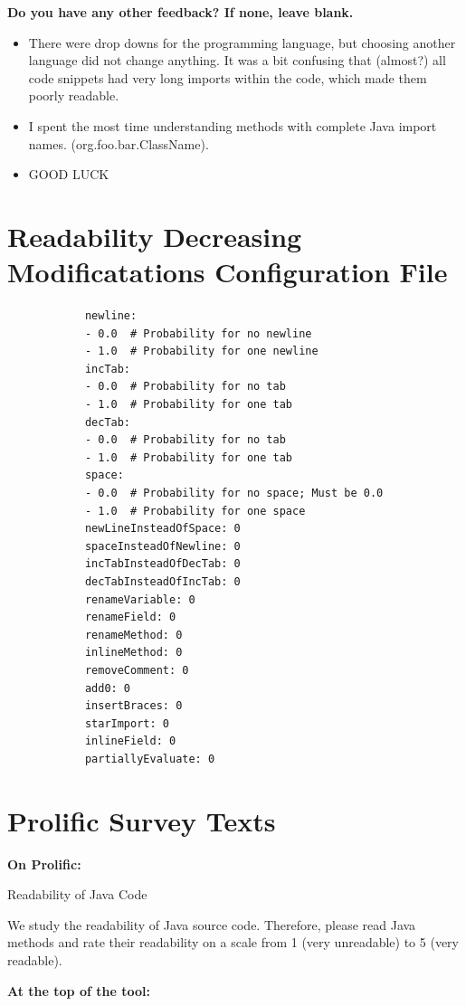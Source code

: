 \documentclass[%
class=scrreprt,
chapterprefix=false,%
open=right,%
twoside=false,%
paper=a4,%
logofile={Logo\_zentral\_farbig\_EN.png},%
thesistype=master,%
UKenglish,%
]{se2thesis}
\theoremstyle{definition}
\newcommand{\RDMs}{Readability Decreasing Modificatations\xspace}
\begin{document}
	\textbf{Do you have any other feedback? If none, leave blank.}
	\begin{itemize}
		\item There were drop downs for the programming language, but choosing another language did not change anything. It was a bit confusing that (almost?) all code snippets had very long imports within the code, which made them poorly readable.
		\item I spent the most time understanding methods with complete Java import names. (org.foo.bar.ClassName).
		\item GOOD LUCK
	\end{itemize}
	
\pagebreak
\section{\RDMs Configuration File}\label{appendix:rdh-config-file}
	\begin{listing}[h!]
		\begin{verbatim}
			newline:
			- 0.0  # Probability for no newline
			- 1.0  # Probability for one newline
			incTab:
			- 0.0  # Probability for no tab
			- 1.0  # Probability for one tab
			decTab:
			- 0.0  # Probability for no tab
			- 1.0  # Probability for one tab
			space:
			- 0.0  # Probability for no space; Must be 0.0
			- 1.0  # Probability for one space
			newLineInsteadOfSpace: 0
			spaceInsteadOfNewline: 0
			incTabInsteadOfDecTab: 0
			decTabInsteadOfIncTab: 0
			renameVariable: 0
			renameField: 0
			renameMethod: 0
			inlineMethod: 0
			removeComment: 0
			add0: 0
			insertBraces: 0
			starImport: 0
			inlineField: 0
			partiallyEvaluate: 0
		\end{verbatim}
		\label{lst:rdh-config-file}
	\end{listing}
	
\pagebreak
\section{Prolific Survey Texts}\label{appendix:prolific-survey-texts}
	\textbf{On Prolific:}
	
	Readability of Java Code
	
	We study the readability of Java source code. Therefore, please read Java methods and rate their readability on a scale from 1 (very unreadable) to 5 (very readable).
	
	\textbf{At the top of the tool:}
	
\end{document}
